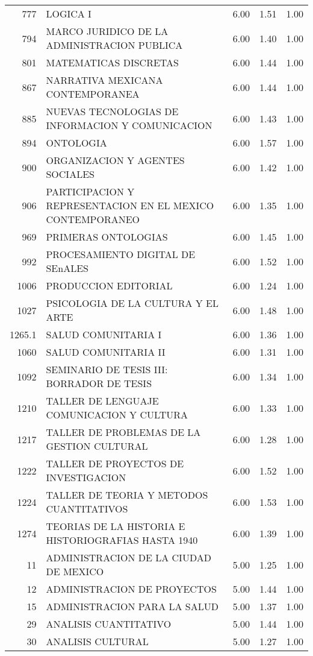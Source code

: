 \documentclass[12pt]{article}
\begin{document}
\begin{table}[ht]
\begin{tabular}{rlrrr}
  777 & LOGICA I & 6.00 & 1.51 & 1.00 \\ 
  794 & MARCO JURIDICO DE LA ADMINISTRACION PUBLICA & 6.00 & 1.40 & 1.00 \\ 
  801 & MATEMATICAS DISCRETAS & 6.00 & 1.44 & 1.00 \\ 
  867 & NARRATIVA MEXICANA CONTEMPORANEA & 6.00 & 1.44 & 1.00 \\ 
  885 & NUEVAS TECNOLOGIAS DE INFORMACION Y COMUNICACION & 6.00 & 1.43 & 1.00 \\ 
  894 & ONTOLOGIA & 6.00 & 1.57 & 1.00 \\ 
  900 & ORGANIZACION Y AGENTES SOCIALES & 6.00 & 1.42 & 1.00 \\ 
  906 & PARTICIPACION Y REPRESENTACION EN EL MEXICO CONTEMPORANEO & 6.00 & 1.35 & 1.00 \\ 
  969 & PRIMERAS ONTOLOGIAS & 6.00 & 1.45 & 1.00 \\ 
  992 & PROCESAMIENTO DIGITAL DE SEnALES & 6.00 & 1.52 & 1.00 \\ 
  1006 & PRODUCCION EDITORIAL & 6.00 & 1.24 & 1.00 \\ 
  1027 & PSICOLOGIA DE LA CULTURA Y EL ARTE & 6.00 & 1.48 & 1.00 \\ 
  1265.1 & SALUD COMUNITARIA I & 6.00 & 1.36 & 1.00 \\ 
  1060 & SALUD COMUNITARIA II & 6.00 & 1.31 & 1.00 \\ 
  1092 & SEMINARIO DE TESIS III: BORRADOR DE TESIS & 6.00 & 1.34 & 1.00 \\ 
  1210 & TALLER DE LENGUAJE COMUNICACION Y CULTURA & 6.00 & 1.33 & 1.00 \\ 
  1217 & TALLER DE PROBLEMAS DE LA GESTION CULTURAL & 6.00 & 1.28 & 1.00 \\ 
  1222 & TALLER DE PROYECTOS DE INVESTIGACION & 6.00 & 1.52 & 1.00 \\ 
  1224 & TALLER DE TEORIA Y METODOS CUANTITATIVOS & 6.00 & 1.53 & 1.00 \\ 
  1274 & TEORIAS DE LA HISTORIA E HISTORIOGRAFIAS HASTA 1940 & 6.00 & 1.39 & 1.00 \\ 
  11 & ADMINISTRACION DE LA CIUDAD DE MEXICO & 5.00 & 1.25 & 1.00 \\ 
  12 & ADMINISTRACION DE PROYECTOS & 5.00 & 1.44 & 1.00 \\ 
  15 & ADMINISTRACION PARA LA SALUD & 5.00 & 1.37 & 1.00 \\ 
  29 & ANALISIS CUANTITATIVO & 5.00 & 1.44 & 1.00 \\ 
  30 & ANALISIS CULTURAL & 5.00 & 1.27 & 1.00 \\ 

\end{tabular}
\end{table}
\end{document}
